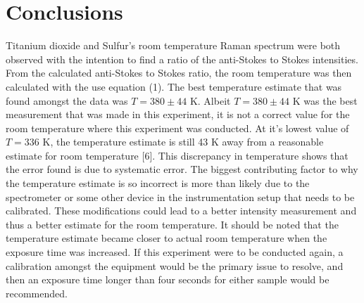 \documentclass[twocolumn]{article}
\begin{document}
\section*{Conclusions}
Titanium dioxide and Sulfur's room temperature Raman spectrum were both observed with the intention to find a ratio of the anti-Stokes to Stokes intensities. From the calculated anti-Stokes to Stokes ratio, the room temperature was then calculated with the use equation (1). The best temperature estimate that was found amongst the data was $T=380\pm44$ K. Albeit $T=380\pm44$ K was the best measurement that was made in this experiment, it is not a correct value for the room temperature where this experiment was conducted. At it's lowest value of $T=336$ K, the temperature estimate is still 43 K away from a reasonable estimate for room temperature [6]. This discrepancy in temperature shows that the error found is due to systematic error. The biggest contributing factor to why the temperature estimate is so incorrect is more than likely due to the spectrometer or some other device in the instrumentation setup that needs to be calibrated. These modifications could lead to a better intensity measurement and thus a better estimate for the room temperature. It should be noted that the temperature estimate became closer to actual room temperature when the exposure time was increased. If this experiment were to be conducted again, a calibration amongst the equipment would be the primary issue to resolve, and then an exposure time longer than four seconds for either sample would be recommended.
\newpage
\end{document}
